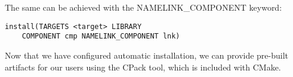 The same can be achieved with the NAMELINK\_COMPONENT keyword:

\begin{lstlisting}[style=styleCMake]
install(TARGETS <target> LIBRARY
	COMPONENT cmp NAMELINK_COMPONENT lnk)
\end{lstlisting}

Now that we have configured automatic installation, we can provide pre-built artifacts for our users using the CPack tool, which is included with CMake.



















